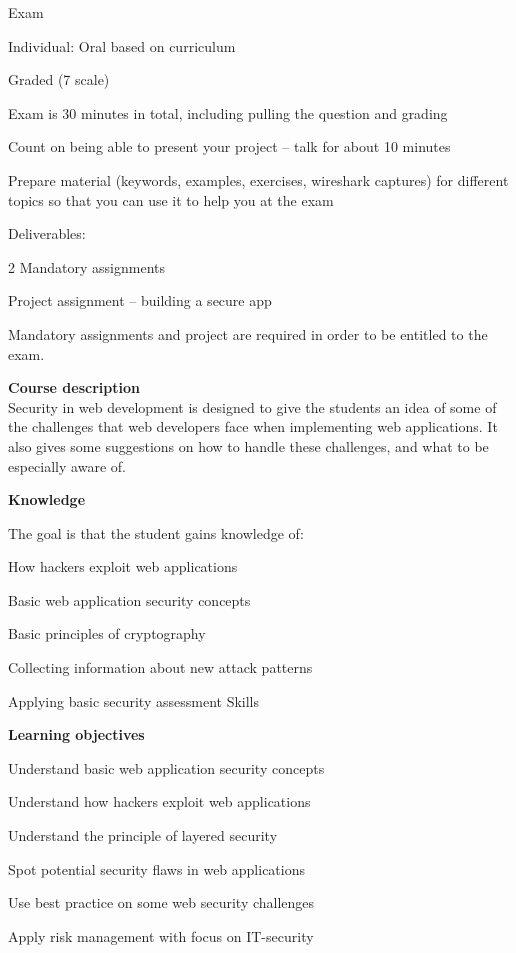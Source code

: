 \documentclass[Screen16to9,17pt]{foils}
\begin{document}
\begin{list2}
\item Exam
\item Individual: Oral based on curriculum
\item Graded (7 scale)
\item Exam is 30 minutes in total, including pulling the question and grading
\item Count on being able to present your project -- talk for about 10 minutes
\item Prepare material (keywords, examples, exercises, wireshark captures) for different topics so that you can use it to help you at the exam

\vskip 5mm
\item Deliverables:
\item 2 Mandatory assignments
\item Project assignment -- building a secure app
\item Mandatory assignments and project are required in order to be entitled to the exam.
\end{list2}



{\bf Course description}\\
Security in web development is designed to give the
students an idea of some of the challenges that web
developers face when implementing web applications. It
also gives some suggestions on how to handle these
challenges, and what to be especially aware of.

{\bf Knowledge}

The goal is that the student gains knowledge of:
\begin{list2}
\item How hackers exploit web applications
\item Basic web application security concepts
\item Basic principles of cryptography
\item Collecting information about new attack patterns
\item Applying basic security assessment Skills
\end{list2}

{\bf Learning objectives}
\begin{list2}
\item Understand basic web application security concepts
\item Understand how hackers exploit web applications
\item Understand the principle of layered security
\item Spot potential security flaws in web applications
\item Use best practice on some web security challenges
\item Apply risk management with focus on IT-security
\end{list2}
\end{document}
